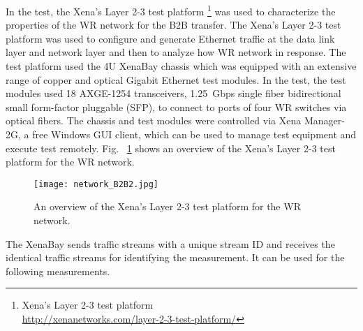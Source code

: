 In the test, the Xena's Layer 2-3 test platform \footnote{Xena's Layer 2-3 test platform\\ \url{http://xenanetworks.com/layer-2-3-test-platform/}} was used to characterize the properties of the WR network for the B2B transfer. The Xena's Layer 2-3 test platform was used to configure and generate Ethernet traffic at the data link layer and network layer and then to analyze how WR network in response. The test platform used the 4U XenaBay chassis which was equipped with an extensive range of copper and optical Gigabit Ethernet test modules. In the test, the test modules used 18 AXGE-1254 transceivers, \SI{1.25}{Gbps} single fiber bidirectional small form-factor pluggable (SFP), to connect to ports of four WR switches via optical fibers. The chassis and test modules were controlled via Xena Manager-2G, a free Windows GUI client, which can be used to manage test equipment and execute test remotely. Fig. ~\ref{network_B2B2} shows an overview of the Xena's Layer 2-3 test platform for the WR network.
\begin{figure}[H]
   \centering   
   \texttt{[image: network\_B2B2.jpg]}
   \caption{An overview of the Xena's Layer 2-3 test platform for the WR network.}
   \label{network_B2B2}
\end{figure}

The XenaBay sends traffic streams with a unique stream ID and receives the identical traffic streams for identifying the measurement. It can be used for the following measurements.

